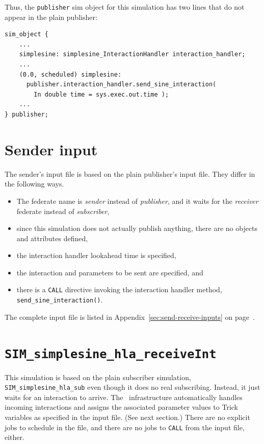 Thus, the {\tt publisher} sim object for this simulation has two
lines that do not appear in the plain publisher:

\begin{lstlisting}[numbers=none,caption={Sending interaction handler \sdefine changes},label={list:sending-interaction-handler-sdefine-changed}]
  sim_object {
    ...
    simplesine: simplesine_InteractionHandler interaction_handler;
    ...
    (0.0, scheduled) simplesine:
      publisher.interaction_handler.send_sine_interaction(
        In double time = sys.exec.out.time );
    ...
} publisher;
\end{lstlisting}

\section{Sender input}

The sender's input file is based on the plain publisher's input file.
They differ in the following ways.
\begin{itemize}
\item{
  The federate name is {\em sender} instead of {\em publisher},
  and it waits for the {\em receiver} federate instead of {\em subscriber},
}
\item{
  since this simulation does not actually publish anything,
  there are no objects and attributes defined,
}
\item{
  the interaction handler lookahead time is specified,
}
\item{
  the interaction and parameters to be sent are specified, and
}
\item{
  there is a {\tt CALL} directive invoking the interaction handler
  method, {\tt send\_sine\_interaction()}.
}
\end{itemize}

The complete input file is listed in
Appendix~\ref{sec:send-receive-inputs}
on page~\pageref{sec:complete-sender-input}.

\section{\tt SIM\_simplesine\_hla\_receiveInt}

This simulation is based on the plain subscriber simulation,
{\tt SIM\_simplesine\_hla\_sub} even though it does no real subscribing.
Instead, it just waits for an interaction to arrive.
The \TrickHLA\ infrastructure automatically handles incoming interactions
and assigns the associated parameter values to Trick variables
as specified in the input file.  (See next section.)
There are no explicit jobs to schedule in the \sdefine file,
and there are no jobs to {\tt CALL} from the input file, either.

